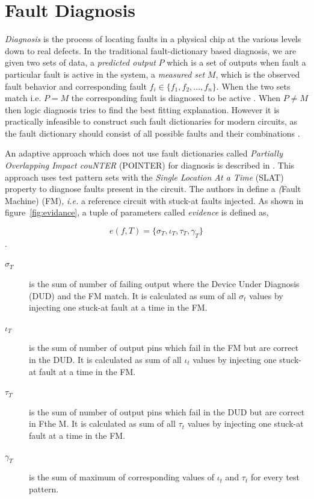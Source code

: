 \section{Fault Diagnosis}
\label{sec:secfd}
\emph{Diagnosis} is the process of locating faults in a physical chip at the various levels down to real defects. In the traditional fault-dictionary based diagnosis, we are given two sets of data, a \emph{predicted output} $P$ which is a set of outputs when fault a particular fault is active in the system, a \emph{measured set} $M$, which is the observed fault behavior and corresponding fault $ f_i \in \{f_1,f_2,...,f_n\} $. When the two sets match i.e. $P = M$ the corresponding fault is diagnosed to be active . When $P \neq M$ then logic diagnosis tries to find the best fitting explanation. However it is practically infeasible to construct such fault dictionaries for modern circuits, as the fault dictionary should consist of all possible faults and their combinations \cite{Wang2010}. 

An adaptive approach which does not use fault dictionaries called \emph{Partially Overlapping Impact couNTER} (POINTER) for diagnosis is described in \cite{Holst2009}. This approach uses test pattern sets with the \emph{Single Location At a Time} (SLAT) property \cite{Bartenstein2001} to diagnose faults present in the circuit. The authors in \cite{Holst2009} define a \emph(Fault Machine) (FM), \emph{i.e.} a reference circuit with stuck-at faults injected. As shown in figure~\ref{fig:evidance}, a tuple of parameters called \emph{evidence} is defined as,

\[e(f,T) = \{\sigma_T, \iota_T, \tau_T, \gamma_T\}\]. 

\begin{description}
	\item[$\sigma_T$] is the sum of number of failing output  where the Device Under Diagnosis (DUD) and the FM match. It is calculated as sum of all $\sigma_t$ values by injecting one stuck-at fault at a time in the FM.
	\item[$\iota_T$] is the sum of number of output pins which fail in the FM but are correct in the DUD. It is calculated as sum of all $\iota_t$ values by injecting one stuck-at fault at a time in the FM.
	\item[$\tau_T$] is the sum of number of output pins which fail in the DUD but are correct in Fthe M. It is calculated as sum of all $\tau_t$ values by injecting one stuck-at fault at a time in the FM.
 	\item[$\gamma_T$] is the sum of maximum of corresponding values of $\iota_t $ and $\tau_t$ for every test pattern.
\end{description}

